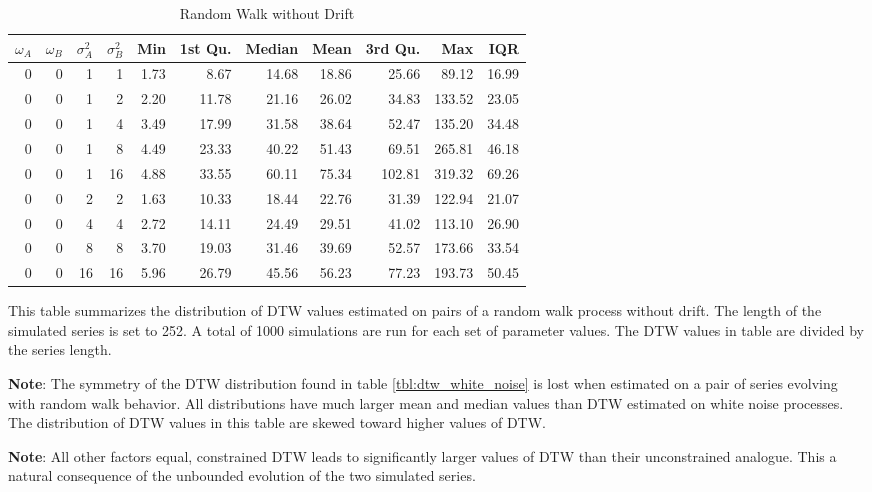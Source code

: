 \documentclass[12pt]{article}
\begin{document}
\begin{table}[!ht]
\begin{center}
\begin{tabular}{r r r r | r r r r r r r}
        $\omega_{A}$ & $\omega_{B}$ & $\sigma^{2}_{A}$ & $\sigma^{2}_{B}$ & Min & 1st Qu. & Median & Mean & 3rd Qu. & Max & IQR \\
        \midrule
        0 & 0 & 1  & 1  & 1.73 & 8.67 & 14.68 & 18.86 &  25.66 &  89.12 & 16.99  \\
        \midrule
        0 & 0 & 1  & 2  & 2.20 & 11.78 & 21.16 & 26.02 &  34.83 & 133.52 & 23.05  \\
        0 & 0 & 1  & 4  & 3.49 & 17.99 & 31.58 & 38.64 &  52.47 & 135.20 & 34.48  \\
        0 & 0 & 1  & 8  & 4.49 & 23.33 & 40.22 & 51.43 &  69.51 & 265.81 & 46.18  \\
        0 & 0 & 1  & 16 & 4.88 & 33.55 & 60.11 & 75.34 & 102.81 & 319.32 & 69.26  \\
        \midrule
        0 & 0 & 2  & 2  & 1.63 & 10.33 & 18.44 & 22.76 &  31.39 & 122.94 & 21.07  \\
        0 & 0 & 4  & 4  & 2.72 & 14.11 & 24.49 & 29.51 &  41.02 & 113.10 & 26.90  \\
        0 & 0 & 8  & 8  & 3.70 & 19.03 & 31.46 & 39.69 &  52.57 & 173.66 & 33.54  \\
        0 & 0 & 16 & 16 & 5.96 & 26.79 & 45.56 & 56.23 &  77.23 & 193.73 & 50.45  \\
        \hline
      \end{tabular}
    \caption{Random Walk without Drift} \label{tbl:dtw_random_walk_no_drift}
    \end{center}
    \begin{tablenotes}
        \item{\footnotesize This table summarizes the distribution of DTW values estimated on pairs of a random walk process without drift. The length of the simulated series is set to 252. A total of 1000 simulations are run for each set of parameter values. The DTW values in table are divided by the series length.}
        \item{\footnotesize \textbf{Note}: The symmetry of the DTW distribution found in table \ref{tbl:dtw_white_noise} is lost when estimated on a pair of series evolving with random walk behavior. All distributions have much larger mean and median values than DTW estimated on white noise processes. The distribution of DTW values in this table are skewed toward higher values of DTW.}
        \item{\footnotesize \textbf{Note}: All other factors equal, constrained DTW leads to significantly larger values of DTW than their unconstrained analogue. This a natural consequence of the unbounded evolution of the two simulated series.}
    \end{tablenotes}
\end{table}
\end{document}
